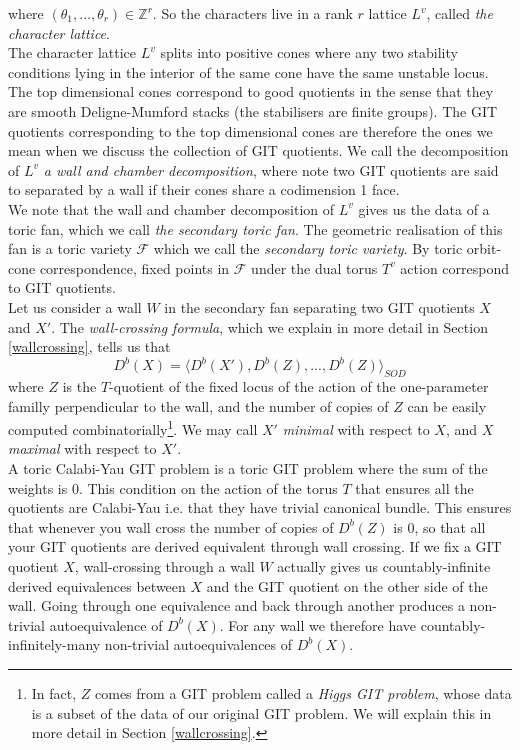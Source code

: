 \documentclass[oneside,reqno]{amsart}
\theoremstyle{definition}
\theoremstyle{definition}
\theoremstyle{definition}
\theoremstyle{definition}
\newcommand{\Z}{\mathbb{Z}}
\newcommand{\Fs}{\mathcal{F}}
\begin{document}
where $(\theta_1, \dots, \theta_r) \in \Z^r$. So the characters live in a rank $r$ lattice $L^v$, called \textit{the character lattice}. \\
\newline
The character lattice $L^v$ splits into positive cones where any two stability conditions lying in the interior of the same cone have the same unstable locus. The top dimensional cones correspond to good quotients in the sense that they are smooth Deligne-Mumford stacks (the stabilisers are finite groups). The GIT quotients corresponding to the top dimensional cones are therefore the ones we mean when we discuss the collection of GIT quotients. We call the decomposition of $L^v$ \textit{a wall and chamber decomposition}, where note two GIT quotients are said to separated by a wall if their cones share a codimension 1 face.\\
\newline
We note that the wall and chamber decomposition of $L^v$ gives us the data of a toric fan, which we call \textit{the secondary toric fan}. The geometric realisation of this fan is a toric variety $\Fs$ which we call the \textit{secondary toric variety}. By toric orbit-cone correspondence, fixed points in $\Fs$ under the dual torus $T^v$ action correspond to GIT quotients.  \\
\newline
Let us consider a wall $W$ in the secondary fan separating two GIT quotients $X$ and $X'$. The \textit{wall-crossing formula}, which we explain in more detail in Section \ref{wallcrossing}, tells us that
$$
D^b(X) = \langle D^b(X'), D^b(Z),...,D^b(Z) \rangle_{SOD}
$$
where $Z$ is the $T$-quotient of the fixed locus of the action of the one-parameter familly perpendicular to the wall, and the number of copies of $Z$ can be easily computed combinatorially\footnote{In fact, $Z$ comes from a GIT problem called a \textit{Higgs GIT problem}, whose data is a subset of the data of our original GIT problem. We will explain this in more detail in Section \ref{wallcrossing}.}. We may call $X'$ \textit{minimal} with respect to $X$, and $X$ \textit{maximal} with respect to $X'$. \\
\newline
A toric Calabi-Yau GIT problem is a toric GIT problem where the sum of the weights is 0. This condition on the action of the torus $T$ that ensures all the quotients are Calabi-Yau i.e. that they have trivial canonical bundle. This ensures that whenever you wall cross the number of copies of $D^b(Z)$ is 0, so that all your GIT quotients are derived equivalent through wall crossing. If we fix a GIT quotient $X$, wall-crossing through a wall $W$ actually gives us countably-infinite derived equivalences between $X$ and the GIT quotient on the other side of the wall. Going through one equivalence and back through another produces a non-trivial autoequivalence of $D^b(X)$. For any wall we therefore have countably-infinitely-many non-trivial autoequivalences of $D^b(X)$. \\
\end{document}
